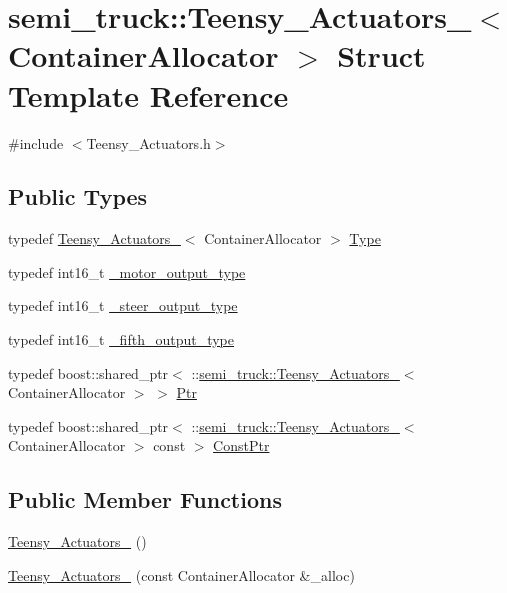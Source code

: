 \hypertarget{structsemi__truck_1_1_teensy___actuators__}{}\section{semi\+\_\+truck\+:\+:Teensy\+\_\+\+Actuators\+\_\+$<$ Container\+Allocator $>$ Struct Template Reference}
\label{structsemi__truck_1_1_teensy___actuators__}


{\ttfamily \#include $<$Teensy\+\_\+\+Actuators.\+h$>$}

\subsection*{Public Types}
\begin{DoxyCompactItemize}
\item 
typedef \hyperlink{structsemi__truck_1_1_teensy___actuators__}{Teensy\+\_\+\+Actuators\+\_\+}$<$ Container\+Allocator $>$ \hyperlink{structsemi__truck_1_1_teensy___actuators___a56c375933030c0e19bf7694945bd84af}{Type}
\item 
typedef int16\+\_\+t \hyperlink{structsemi__truck_1_1_teensy___actuators___a1cefa1e8e0f45e76b2f6322407c74ab1}{\+\_\+motor\+\_\+output\+\_\+type}
\item 
typedef int16\+\_\+t \hyperlink{structsemi__truck_1_1_teensy___actuators___a38b3265a1e0521620575f2cdcec23d1a}{\+\_\+steer\+\_\+output\+\_\+type}
\item 
typedef int16\+\_\+t \hyperlink{structsemi__truck_1_1_teensy___actuators___ac866dd52df9dc5d61aac2c073d49c91b}{\+\_\+fifth\+\_\+output\+\_\+type}
\item 
typedef boost\+::shared\+\_\+ptr$<$ \+::\hyperlink{structsemi__truck_1_1_teensy___actuators__}{semi\+\_\+truck\+::\+Teensy\+\_\+\+Actuators\+\_\+}$<$ Container\+Allocator $>$ $>$ \hyperlink{structsemi__truck_1_1_teensy___actuators___a5146b132d18f66dab87b575f3591049f}{Ptr}
\item 
typedef boost\+::shared\+\_\+ptr$<$ \+::\hyperlink{structsemi__truck_1_1_teensy___actuators__}{semi\+\_\+truck\+::\+Teensy\+\_\+\+Actuators\+\_\+}$<$ Container\+Allocator $>$ const  $>$ \hyperlink{structsemi__truck_1_1_teensy___actuators___a7a0d58ea72ee326dfe3e3476ae6ef61f}{Const\+Ptr}
\end{DoxyCompactItemize}
\subsection*{Public Member Functions}
\begin{DoxyCompactItemize}
\item 
\hyperlink{structsemi__truck_1_1_teensy___actuators___ad09b32ec959790bca4f07de7d79f138e}{Teensy\+\_\+\+Actuators\+\_\+} ()
\item 
\hyperlink{structsemi__truck_1_1_teensy___actuators___a61de3eb36f071a8067fb7e0d86cbc3e6}{Teensy\+\_\+\+Actuators\+\_\+} (const Container\+Allocator \&\+\_\+alloc)
\end{DoxyCompactItemize}
